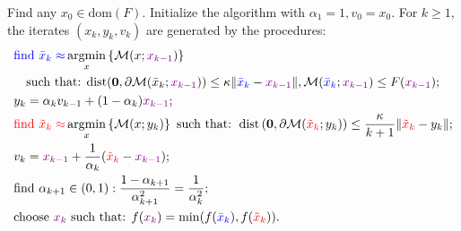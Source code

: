 \documentclass[12pt]{article}
\begin{document}
    \begin{definition}
        Find any $x_0 \in \text{dom}(F)$. 
        Initialize the algorithm with $\alpha_1 = 1, v_0 = x_0$. 
        For $k \ge 1$, the iterates $(x_k, y_k, v_k)$ are generated by the procedures: 
        \vspace{-0.5em}
        \begin{align*}
            &
            \textcolor{blue}{
                \text{find } \bar x_k \approx 
            }
            \mathop{\rm argmin}\limits_{x}\left\lbrace
                    \mathcal M(x; \textcolor{violet}{x_{k - 1}})
                \right\rbrace
            \\ &\quad 
            \text{such that: }
                \text{dist}(\mathbf 0, \partial \mathcal M(\bar x_k; \textcolor{violet}{x_{k - 1}})) 
                \le 
                \kappa\Vert \textcolor{blue}{\bar x_k}- \textcolor{violet}{x_{k - 1}}\Vert, 
                \mathcal M(\textcolor{blue}{\bar x_k}; \textcolor{violet}{x_{k - 1}}) 
                \le F(\textcolor{violet}{x_{k - 1}}); 
            \\
            & y_k = \alpha_k v_{k - 1} + (1 - \alpha_k) \textcolor{violet}{x_{k - 1}};
            \\
            & 
            \textcolor{red}{\text{find }\tilde x_k \approx}
            \mathop{\rm argmin}\limits_{x} \left\lbrace
                \mathcal M(x; y_k) 
            \right\rbrace
            \text{ such that: }
                \operatorname{dist}\left(
                    \mathbf 0, \partial \mathcal M(\textcolor{red}{\tilde x_k}; y_k)
                \right) 
                \le \frac{\kappa}{k + 1}\Vert \textcolor{red}{\tilde x_k} - y_k\Vert
            ;
            \\
            & v_{k} = \textcolor{violet}{x_{k - 1}} + \frac{1}{\alpha_k}(
                    \textcolor{red}{\tilde x_k} - \textcolor{violet}{x_{k - 1}}
                );
            \\
            & 
            \text{find } \alpha_{k + 1} \in (0, 1): 
            \frac{1 - \alpha_{k + 1}}{\alpha_{k + 1}^2} = \frac{1}{\alpha_k^2};
            \\
            & \text{choose } \textcolor{violet}{x_k} \text{ such that:  } 
            f(\textcolor{violet}{x_k}) = \min(f(\textcolor{blue}{\bar x_k}), f(\textcolor{red}{\tilde x_k})). 
        \end{align*}
    \end{definition}
    
\end{document}

